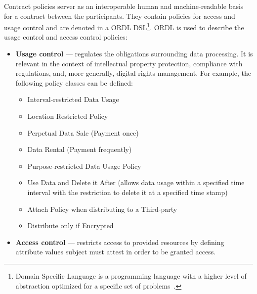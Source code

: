 Contract policies server as an interoperable human and machine-readable basis for a contract between the participants.
They contain policies for access and usage control and are denoted in a ORDL DSL\footnote{Domain Specific Language is a programming language with a higher level of abstraction optimized for a specific set of problems~\cite{domain_specific_languages}.}.
ORDL is used to describe the usage control and access control policies:
\begin{itemize}
    \item \textbf{Usage control} --- regulates the obligations surrounding data processing.
    It is relevant in the context of intellectual property protection, compliance with regulations, and, more generally, digital rights management.
    For example, the following policy classes can be defined:
    \begin{itemize}
        \item Interval-restricted Data Usage
        \item Location Restricted Policy
        \item Perpetual Data Sale (Payment once)
        \item Data Rental (Payment frequently)
        \item Purpose-restricted Data Usage Policy
        \item Use Data and Delete it After (allows data usage within a specified time interval with the restriction to delete it at a specified time stamp)
        \item Attach Policy when distributing to a Third-party
        \item Distribute only if Encrypted
    \end{itemize}
    \item \textbf{Access control} --- restricts access to provided resources by defining attribute values subject must attest in order to be granted access.
\end{itemize}

